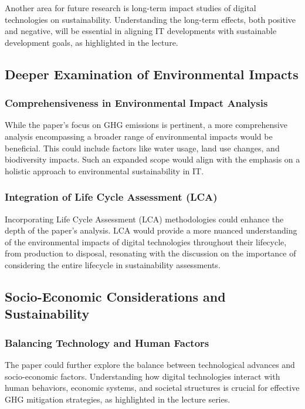 \documentclass[conference,compsoc]{IEEEtran}
\begin{document}
Another area for future research is long-term impact studies of digital technologies on sustainability. Understanding the long-term effects, both positive and negative, will be essential in aligning IT developments with sustainable development goals, as highlighted in the lecture.

\subsection{Deeper Examination of Environmental Impacts}

\subsubsection{Comprehensiveness in Environmental Impact Analysis}

While the paper's focus on GHG emissions is pertinent, a more comprehensive analysis encompassing a broader range of environmental impacts would be beneficial. This could include factors like water usage, land use changes, and biodiversity impacts. Such an expanded scope would align with the  emphasis on a holistic approach to environmental sustainability in IT.

\subsubsection{Integration of Life Cycle Assessment (LCA)}

Incorporating Life Cycle Assessment (LCA) methodologies could enhance the depth of the paper's analysis. LCA would provide a more nuanced understanding of the environmental impacts of digital technologies throughout their lifecycle, from production to disposal, resonating with the  discussion on the importance of considering the entire lifecycle in sustainability assessments.

\subsection{Socio-Economic Considerations and Sustainability}

\subsubsection{Balancing Technology and Human Factors}

The paper could further explore the balance between technological advances and socio-economic factors. Understanding how digital technologies interact with human behaviors, economic systems, and societal structures is crucial for effective GHG mitigation strategies, as highlighted in the lecture series.
\end{document}
